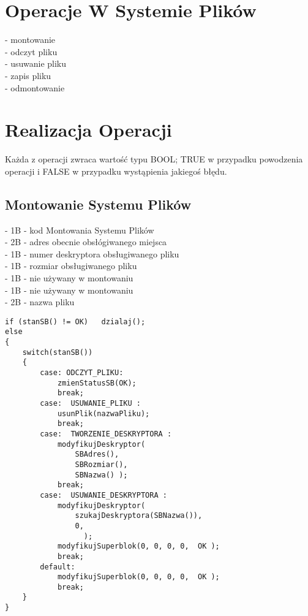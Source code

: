 \documentclass[paper=a4, fontsize=11pt]{scrartcl} %
\numberwithin{equation}{section} %
\numberwithin{figure}{section} %
\numberwithin{table}{section} %
\begin{document}
\section{Operacje W Systemie Plików}
- montowanie \\
- odczyt pliku \\
- usuwanie pliku\\
- zapis pliku \\
- odmontowanie \\

\section{Realizacja Operacji}
Każda z operacji zwraca wartość typu BOOL; TRUE w przypadku powodzenia operacji i FALSE w przypadku wystąpienia jakiegoś błędu. 

\subsection{Montowanie Systemu Plików}
- 1B - kod Montowania Systemu Plików\\
- 2B - adres obecnie obsłógiwanego miejsca\\
- 1B - numer deskryptora obsługiwanego pliku\\
- 1B - rozmiar obsługiwanego pliku\\
- 1B - nie używany w montowaniu\\
- 1B - nie używany w montowaniu\\
- 2B - nazwa pliku\\
\begin{samepage}
\begin{lstlisting}
if (stanSB() != OK)   dzialaj(); 
else 
{
    switch(stanSB()) 
	{
		case: ODCZYT_PLIKU: 
            zmienStatusSB(OK);  
            break; 
        case:  USUWANIE_PLIKU : 
            usunPlik(nazwaPliku); 
            break; 
        case:  TWORZENIE_DESKRYPTORA : 
            modyfikujDeskryptor( 
                SBAdres(),  
                SBRozmiar(),  
                SBNazwa() ); 
            break; 
        case:  USUWANIE_DESKRYPTORA :  
            modyfikujDeskryptor( 
                szukajDeskryptora(SBNazwa()), 
                0,  
                  ); 
            modyfikujSuperblok(0, 0, 0, 0,  OK ); 
            break; 
        default: 
            modyfikujSuperblok(0, 0, 0, 0,  OK ); 
            break; 
	}
}
\end{lstlisting}
\end{samepage}
\end{document}
